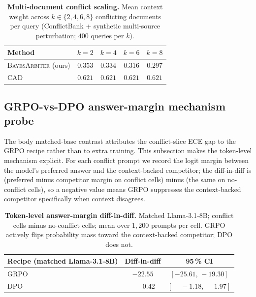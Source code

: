 \begin{table}[H]
\centering\small
\caption{\textbf{Multi-document conflict scaling.} Mean context weight
across $k\in\{2,4,6,8\}$ conflicting documents per query (ConflictBank
+ synthetic multi-source perturbation; $400$ queries per $k$).}
\label{tab:multidoc-scaling}
\setlength{\tabcolsep}{8pt}
\begin{tabular}{lcccc}
\toprule
\textbf{Method} & $k=2$ & $k=4$ & $k=6$ & $k=8$\\
\midrule
\textsc{BayesArbiter} (ours) & $0.353$ & $0.334$ & $0.316$ & $\mathbf{0.297}$\\
CAD                  & $0.621$ & $0.621$ & $0.621$ & $0.621$\\
\bottomrule
\end{tabular}
\end{table}

\subsection{GRPO-vs-DPO answer-margin mechanism probe}
\label{app:mechanism-grpo-dpo}

The body matched-base contrast attributes the conflict-slice ECE gap
to the GRPO recipe rather than to extra training.  This subsection
makes the token-level mechanism explicit.  For each conflict prompt we
record the logit margin between the model's preferred answer and the
context-backed competitor; the diff-in-diff is (preferred minus
competitor margin on conflict cells) minus (the same on no-conflict
cells), so a negative value means GRPO suppresses the context-backed
competitor specifically when context disagrees.

\begin{table}[H]
\centering\small
\caption{\textbf{Token-level answer-margin diff-in-diff.}  Matched
Llama-3.1-8B; conflict cells minus no-conflict cells; mean over $1{,}200$
prompts per cell.  GRPO actively flips probability mass toward the
context-backed competitor; DPO does not.}
\label{tab:mechanism-grpo-dpo}
\setlength{\tabcolsep}{8pt}
\begin{tabular}{lcc}
\toprule
\textbf{Recipe (matched Llama-3.1-8B)} & \textbf{Diff-in-diff} & \textbf{95\,\% CI}\\
\midrule
GRPO & $-22.55$ & $[-25.61,\,-19.30]$\\
DPO  & $\phantom{-}\phantom{0}0.42$  & $[\phantom{-}-1.18,\,\phantom{-}1.97]$\\
\bottomrule
\end{tabular}
\end{table}

